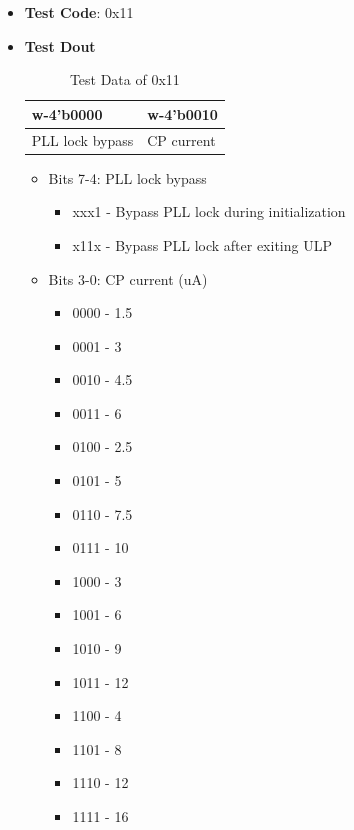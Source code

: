 \documentclass[main\_\_EN.tex]{subfiles}
\begin{document}
\begin{itemize}
    \item \textbf{Test Code}: 0x11
    \item \textbf{Test Dout} 
        \begin{longtable}{ |p{6cm}|p{6cm}|}
            \caption{Test Data of 0x11}
            \label{tab:test-data-0x11} \\
            \hline
            \rowcolor{lightgray}
            \textbf{w-4'b0000} & \textbf{w-4'b0010} \\ \hline
            PLL lock bypass & CP current  \\ \hline
        \end{longtable}
        \begin{itemize}
            \item Bits 7-4: PLL lock bypass
                \begin{itemize}
                    \item xxx1 - Bypass PLL lock during initialization
                    \item x11x - Bypass PLL lock after exiting ULP
                \end{itemize}
            \item Bits 3-0: CP current (uA)
                \begin{itemize}
                    \item 0000 - 1.5
                    \item 0001 - 3
                    \item 0010 - 4.5
                    \item 0011 - 6
                    \item 0100 - 2.5
                    \item 0101 - 5
                    \item 0110 - 7.5
                    \item 0111 - 10
                    \item 1000 - 3
                    \item 1001 - 6
                    \item 1010 - 9
                    \item 1011 - 12
                    \item 1100 - 4
                    \item 1101 - 8
                    \item 1110 - 12
                    \item 1111 - 16
                \end{itemize}

\end{itemize}
\end{itemize}
\end{document}
